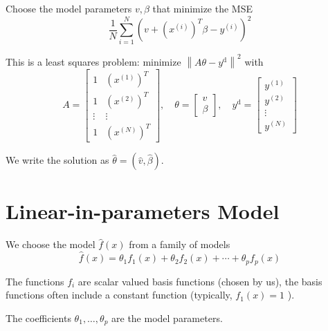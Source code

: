 \begin{problem}
    Choose the model parameters $ v, \beta $ that minimize the MSE
    \begin{equation}
    \frac{1}{N} \sum_{i=1}^{N}\left(v+\left(x^{(i)}\right)^{T} \beta-y^{(i)}\right)^{2}
    \end{equation}

\end{problem}


This is a least squares problem: minimize $ \left\|A \theta-y^{\mathrm{d}}\right\|^{2} $ with
\begin{equation}
A=\left[\begin{array}{cc}
1 & \left(x^{(1)}\right)^{T} \\
1 & \left(x^{(2)}\right)^{T} \\
\vdots & \vdots \\
1 & \left(x^{(N)}\right)^{T}
\end{array}\right], \quad \theta=\left[\begin{array}{c}
v \\
\beta
\end{array}\right], \quad y^{\mathrm{d}}=\left[\begin{array}{c}
y^{(1)} \\
y^{(2)} \\
\vdots \\
y^{(N)}
\end{array}\right]
\end{equation}

\begin{notation}
    We write the solution as $ \hat{\theta}=(\hat{v}, \hat{\beta}) $.
\end{notation}



\section{Linear-in-parameters Model}

\begin{problem}
    We choose the model $ \hat{f}(x) $ from a family of models
\begin{equation}
\hat{f}(x)=\theta_{1} f_{1}(x)+\theta_{2} f_{2}(x)+\cdots+\theta_{p} f_{p}(x)
\end{equation}

The functions $ f_{i} $ are scalar valued basis functions (chosen by us), the basis functions often include a constant function (typically, $ f_{1}(x)=1 $ ). 

The coefficients $ \theta_{1}, \ldots, \theta_{p} $ are the model parameters.
\end{problem}

